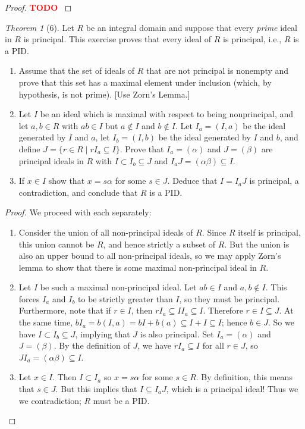 \documentclass[12pt]{article}
\theoremstyle{remark}
\theoremstyle{named}
\newtheorem*{theorem}{Theorem}
\newcommand{\todo}{\textcolor{red}{\textbf{TODO} }}
\renewcommand{\a}{\alpha}
\renewcommand{\b}{\beta}
\begin{document}
\begin{proof}
    \todo
\end{proof}

\begin{theorem}[6]
    Let \(R\) be an integral domain and suppose that every \textit{prime} ideal in \(R\) is principal. This exercise proves that every ideal of \(R\) is principal, i.e., \(R\) is a PID.
    \begin{enumerate}
        \item Assume that the set of ideals of \(R\) that are not principal is nonempty and prove that this set has a maximal element under inclusion (which, by hypothesis, is not prime). [Use Zorn's Lemma.]
        \item Let \(I\) be an ideal which is maximal with respect to being nonprincipal, and let \(a, b\in R\) with \(ab \in I\) but \(a \notin I\) and \(b \notin I\). Let \(I_a = (I, a)\) be the ideal generated by \(I\) and \(a\), let \(I_b = (I, b)\) be the ideal generated by \(I\) and \(b\), and define \(J = \{r \in R \mid rI_a \subseteq I\}\). Prove that \(I_a = (\a)\) and \(J = (\b)\) are principal ideals in \(R\) with \(I \subset I_b \subseteq J\) and \(I_a J = (\a \b) \subseteq I\).
        \item If \(x \in I\) show that \(x = s \a\) for some \(s \in J\). Deduce that \(I = I_a J\) is principal, a contradiction, and conclude that \(R\) is a PID.
    \end{enumerate}
\end{theorem}

\begin{proof}
    We proceed with each separately:
    \begin{enumerate}
        \item Consider the union of all non-principal ideals of \(R\). Since \(R\) itself is principal, this union cannot be \(R\), and hence strictly a subset of \(R\). But the union is also an upper bound to all non-principal ideals, so we may apply Zorn's lemma to show that there is some maximal non-principal ideal in \(R\).
        \item Let \(I\) be such a maximal non-principal ideal. Let \(ab \in I\) and \(a, b \notin I\). This forces \(I_a\) and \(I_b\) to be strictly greater than \(I\), so they must be principal. Furthermore, note that if \(r \in I\), then \(rI_a \subseteq II_a \subseteq I \). Therefore \(r \in I \subseteq J\). At the same time, \(bI_a = b(I, a) = bI + b(a) \subseteq I + I \subseteq I\); hence \(b \in J\). So we have \(I \subset I_b \subseteq J\), implying that \(J\) is also principal. Set \(I_a = (\a)\) and \(J = (\b)\). By the definition of \(J\), we have \(r I_a \subseteq I\) for all \(r \in J\), so \(JI_a = (\a\b) \subseteq I\).
        \item Let \(x \in I\). Then \(I \subset I_a\) so \(x = s\a\) for some \(s \in R\). By definition, this means that \(s \in J\). But this implies that \(I \subseteq I_aJ\), which is a principal ideal! Thus we we contradiction; \(R\) must be a PID.
    \end{enumerate}
\end{proof}
\end{document}
